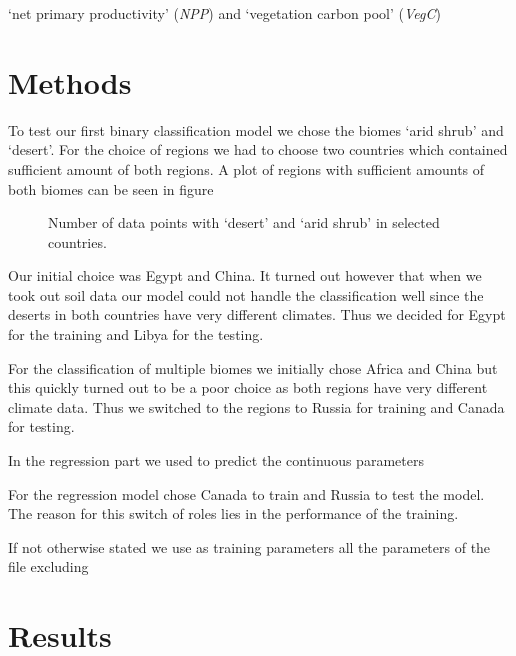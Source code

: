 `net primary productivity' (\emph{NPP}) and `vegetation carbon pool' (\emph{VegC})

\section{Methods}

To test our first binary classification model we chose the biomes `arid shrub' and `desert'. For the choice of regions
we had to choose two countries which contained sufficient amount of both regions. A plot of regions with sufficient amounts
of both biomes can be seen in figure 
\begin{figure}
  \centering
  \begin{minipage}{0.45\textwidth}
    \centering
    \missingfigure[figwidth=\textwidth]{}
    \caption{Number of data points with `desert' and `arid shrub' in selected countries.}
    \label{pl:}
  \end{minipage}
\end{figure}
Our initial choice was Egypt and China.
It turned out however that when we took out soil data our model could not handle the classification well since 
the deserts in both countries have very different climates. Thus we decided for Egypt for the training and Libya for the testing.

For the classification of multiple biomes we initially chose Africa and China but this quickly turned out to be a poor choice as
both regions have very different climate data. Thus we switched to the regions to Russia for training and Canada for testing.

In the regression part we used   to predict the continuous parameters 

For the regression model chose Canada to train and Russia to test the model. The reason for this switch of roles lies in the performance
of the training.

If not otherwise stated we use as training parameters all the parameters of the file  excluding


\section{Results}

